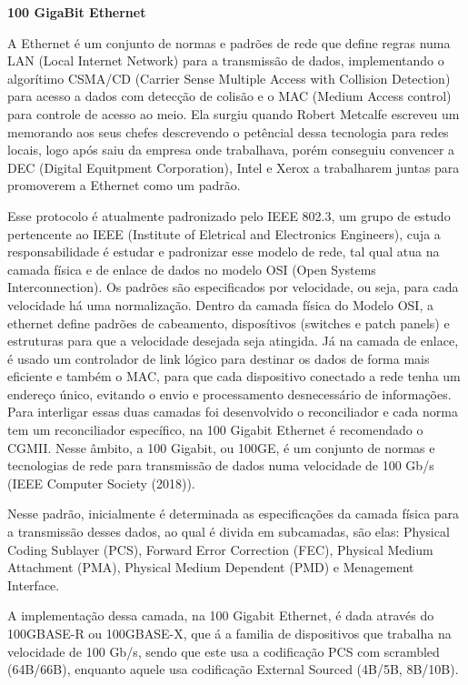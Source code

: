 \documentclass[a4paper,12pt]{article}
\begin{document}
\begin{center}
\textbf{{\LARGE 100 GigaBit Ethernet}} \\ \vspace{0.5cm}
\end{center}

A Ethernet é um conjunto de normas e padrões de rede que define regras numa LAN (Local Internet Network) para a transmissão de dados, implementando o algorítimo CSMA/CD (Carrier Sense Multiple Access with Collision Detection) para acesso a dados com detecção de colisão e o MAC (Medium Access control) para controle de acesso ao meio. Ela surgiu quando Robert Metcalfe escreveu um memorando aos seus chefes descrevendo o petêncial dessa tecnologia para redes locais, logo após saiu da empresa onde trabalhava, porém conseguiu convencer a DEC (Digital Equitpment Corporation), Intel e Xerox a trabalharem juntas para promoverem a Ethernet como um padrão.

Esse protocolo é atualmente padronizado pelo IEEE 802.3, um grupo de estudo pertencente ao IEEE (Institute of Eletrical and Electronics Engineers), cuja a responsabilidade é estudar e padronizar esse modelo de rede, tal qual atua na camada física e de enlace de dados no modelo OSI (Open Systems Interconnection). Os padrões são especificados por velocidade, ou seja, para cada velocidade há uma normalização.
Dentro da camada física do Modelo OSI, a ethernet define padrões de cabeamento, disposítivos (switches e patch panels) e estruturas para que a velocidade desejada seja atingida.
Já na camada de enlace, é usado um controlador de link lógico para destinar os dados de forma mais eficiente e também o MAC, para que cada dispositivo conectado a rede tenha um endereço único, evitando o envio e processamento desnecessário de informações.
Para interligar essas duas camadas foi desenvolvido o reconciliador e cada norma tem um reconciliador específico, na 100 Gigabit Ethernet é recomendado o CGMII.
Nesse âmbito, a 100 Gigabit, ou 100GE, é um conjunto de normas e tecnologias de rede para transmissão de dados numa velocidade de 100 Gb/s (IEEE Computer Society (2018)).


Nesse padrão, inicialmente é determinada as especificações da camada física para a transmissão desses dados, ao qual é divida em subcamadas, são elas: Physical Coding Sublayer (PCS), Forward Error Correction (FEC), Physical Medium Attachment (PMA), Physical Medium Dependent (PMD) e Menagement Interface.

A implementação dessa camada, na 100 Gigabit Ethernet, é dada através do 100GBASE-R ou 100GBASE-X, que á a familia de dispositivos que trabalha na velocidade de 100 Gb/s, sendo que este usa a codificação PCS com scrambled (64B/66B), enquanto aquele usa codificação External Sourced (4B/5B, 8B/10B).
\end{document}
